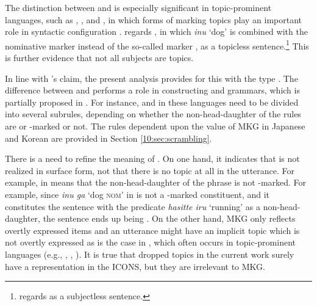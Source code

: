 

The distinction between  and  is
especially significant in topic-prominent languages, such as
, , and , in which forms of
marking topics play an important role in syntactic configuration
\citep{li:thompson:76,huang:84}.
\citet{lambrecht:96} regards , in which \textit{inu}
`dog' is combined with the nominative marker \ga instead of the
so-called  marker \wa, as a topicless
sentence.\footnote{\citet{kuroda:72} regards  as a
  subjectless sentence.}  This is further evidence that not all
subjects are topics.




\noindent In line with \citeauthor{lambrecht:96}'s claim, the present
analysis provides for this with the type .  The
difference between  and  performs a
role in constructing  and  grammars, which
is partially proposed in \citet{song:bender:11}. For instance,
 and  in these languages need
to be divided into several subrules, depending on whether the
non-head-daughter of the rules are \wa or \onun-marked or not.  The
rules dependent upon the value of MKG in Japanese and Korean are
provided in Section \ref{10:sec:scrambling}.




There is a need to refine the meaning of .
On one hand, it indicates that  is not realized in surface form, not that
there is no topic at all in the utterance.  For example,
 in  means that the non-head-daughter of
the phrase is not \wa-marked.  For example, since \textit{inu ga} `dog
\textsc{nom}' in  is not a \wa-marked constituent,
and it constitutes the sentence with the predicate \textit{hasitte
  iru} `running' as a non-head-daughter, the sentence ends up being
. On the other hand, MKG only reflects overtly
expressed items and an utterance might have an implicit topic which is
not overtly expressed as is the case in , which often occurs
in topic-prominent languages (e.g., , , ).
It is true that dropped topics in the current work surely
have a representation in the ICONS, but they are irrelevant to MKG.



